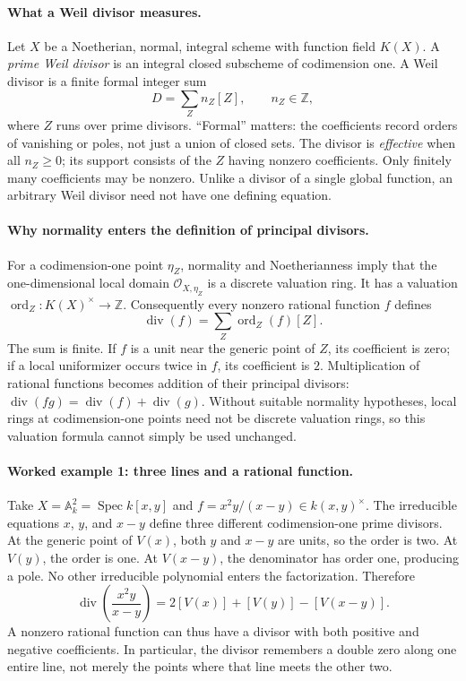 \paragraph{What a Weil divisor measures.}
Let $X$ be a Noetherian, normal, integral scheme with function field
$K(X)$.  A \emph{prime Weil divisor} is an integral closed subscheme
of codimension one.  A Weil divisor is a finite formal integer sum
\[
 D=\sum_Z n_Z[Z],\qquad n_Z\in\mathbb Z,
\]
where $Z$ runs over prime divisors.  ``Formal'' matters: the coefficients
record orders of vanishing or poles, not just a union of closed sets.
The divisor is \emph{effective} when all $n_Z\geq0$; its support
consists of the $Z$ having nonzero coefficients.  Only finitely many
coefficients may be nonzero.  Unlike a divisor of a single global
function, an arbitrary Weil divisor need not have one defining equation.

\paragraph{Why normality enters the definition of principal divisors.}
For a codimension-one point $\eta_Z$, normality and Noetherianness
imply that the one-dimensional local domain
$\mathcal O_{X,\eta_Z}$ is a discrete valuation ring.  It has a
valuation
$\operatorname{ord}_Z\colon K(X)^\times\to\mathbb Z$.
Consequently every nonzero rational function $f$ defines
\[
 \operatorname{div}(f)=\sum_Z\operatorname{ord}_Z(f)[Z].
\]
The sum is finite.  If $f$ is a unit near the generic point of $Z$,
its coefficient is zero; if a local uniformizer occurs twice in $f$,
its coefficient is $2$.  Multiplication of rational functions becomes
addition of their principal divisors:
$\operatorname{div}(fg)=\operatorname{div}(f)+\operatorname{div}(g)$.
Without suitable normality hypotheses, local rings at codimension-one
points need not be discrete valuation rings, so this valuation formula
cannot simply be used unchanged.

\paragraph{Worked example 1: three lines and a rational function.}
Take $X=\mathbb A_k^2=\operatorname{Spec}k[x,y]$ and
$f=x^2y/(x-y)\in k(x,y)^\times$.  The irreducible equations
$x$, $y$, and $x-y$ define three different codimension-one prime
divisors.  At the generic point of $V(x)$, both $y$ and $x-y$
are units, so the order is two.  At $V(y)$, the order is one.
At $V(x-y)$, the denominator has order one, producing a pole.
No other irreducible polynomial enters the factorization.  Therefore
\[
 \operatorname{div}\!\left(\frac{x^2y}{x-y}\right)
    =2[V(x)]+[V(y)]-[V(x-y)].
\]
A nonzero rational function can thus have a divisor with both
positive and negative coefficients.  In particular, the divisor
remembers a double zero along one entire line, not merely the points
where that line meets the other two.

